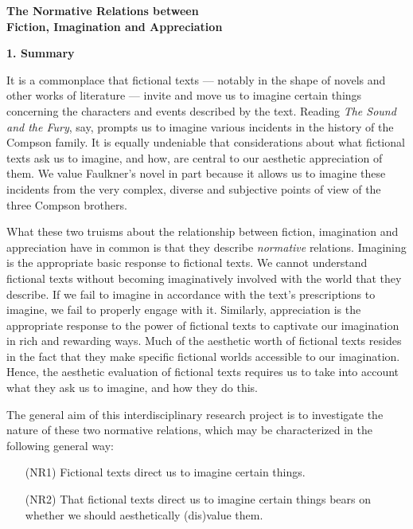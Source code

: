 \begin{center}
\noindent\textbf{\large The Normative Relations between\\ Fiction, Imagination and
Appreciation}
\end{center}


\noindent\textbf{\large 1. Summary}
\vspace{.1cm}

\noindent It is a commonplace that fictional texts --- notably in the shape of novels and other works of literature --- invite and move us to imagine certain things concerning the characters and events described by the text. Reading \emph{The Sound and the Fury}, say, prompts us to imagine various incidents in the history of the Compson family. It is equally undeniable that considerations about what fictional texts ask us to imagine, and how, are central to our aesthetic appreciation of them. We value Faulkner's novel in part because it allows us to imagine these incidents from the very complex, diverse and subjective points of view of the three Compson brothers.

What these two truisms about the relationship between fiction, imagination and appreciation have in common is that they describe \emph{normative} relations. Imagining is the appropriate basic response to fictional texts. We cannot understand fictional texts without becoming imaginatively involved with the world that they describe. If we fail to imagine in accordance with the text's prescriptions to imagine, we fail to properly engage with it. Similarly, appreciation is the appropriate response to the power of fictional texts to captivate our imagination in rich and rewarding ways. Much of the aesthetic worth of fictional texts resides in the fact that they make specific fictional worlds accessible to our imagination. Hence, the aesthetic evaluation of fictional texts requires us to take into account what they ask us to imagine, and how they do this.

The general aim of this interdisciplinary research project is to investigate the nature of these two normative relations, which may be characterized in the following general way:


\vspace{-.1cm}
\begin{itemize}[leftmargin=2cm]
\item[{(NR1)}] Fictional texts direct us to imagine certain things.
\vspace{-.2cm}
\item[{(NR2)}] That fictional texts direct us to imagine certain things bears on whether we should aesthetically (dis)value them. 
\end{itemize}
\vspace{-.1cm}


